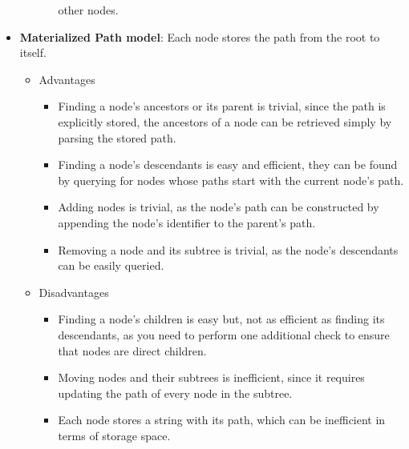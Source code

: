 \begin{itemize}
\begin{itemize}
\begin{itemize}
			                  other nodes.
		            \end{itemize}
	      \end{itemize}
	\item \textbf{Materialized Path model}: Each node stores the path from the root to itself.
	      \begin{itemize}
		      \item Advantages
		            \begin{itemize}
			            \item Finding a node’s ancestors or its parent is trivial, since the path is explicitly stored,
			                  the ancestors of a node can be retrieved simply by parsing the stored path.
			            \item Finding a node’s descendants is easy and efficient, they can be found by
			                  querying for nodes whose paths start with the current node's path.
			            \item Adding nodes is trivial, as the node's path can be constructed by appending
			                  the node's identifier to the parent's path.
			            \item Removing a node and its subtree is trivial, as the node's descendants can be
			                  easily queried.
		            \end{itemize}
		      \item Disadvantages
		            \begin{itemize}
			            \item Finding a node's children is easy but, not as efficient as finding its
			                  descendants, as you need to perform one additional check to ensure that nodes
			                  are direct children.
			            \item Moving nodes and their subtrees is inefficient, since it requires updating
			                  the path of every node in the subtree.
			            \item Each node stores a string with its path, which can be inefficient in terms of
			                  storage space.
		            \end{itemize}
	      \end{itemize}
\end{itemize}

